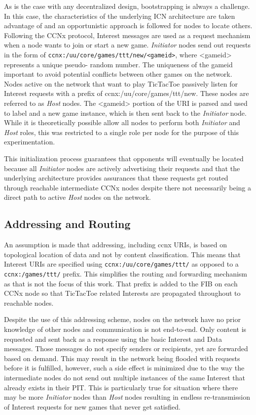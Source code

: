 \documentclass[a4paper,12pt]{report}      %
\begin{document}
As is the case with any decentralized design, bootstrapping is always a challenge. In this case, the
characteristics of the underlying ICN architecture are taken advantage of and an opportunistic approach
is followed for nodes to locate others. Following the CCNx protocol, Interest messages are used as a
request mechanism when a node wants to join or start a new game. \emph{Initiator} nodes send out requests in
the form of \verb!ccnx:/uu/core/games/ttt/new/<gameid>!, where <gameid> represents a unique pseudo-
random number. The uniqueness of the gameid important to avoid potential conflicts between other
games on the network. Nodes active on the network that want to play TicTacToe passively listen for
Interest requests with a prefix of ccnx:/uu/core/games/ttt/new. These nodes are referred to as \emph{Host}
nodes. The <gameid> portion of the URI is parsed and used to label and a new game instance, which is
then sent back to the \emph{Initiator} node. While it is theoretically possible allow 
all nodes to perform both \emph{Initiator} and \emph{Host} roles, this was restricted to a single role per node for
the purpose of this experimentation.

This initialization process guarantees that opponents will eventually be located because all \emph{Initiator}
nodes are actively advertising their requests and that the underlying architecture provides assurances
that these requests get routed through reachable intermediate CCNx nodes despite there not necessarily
being a direct path to active \emph{Host} nodes on the network.

\subsection{Addressing and Routing}

An assumption is made that addressing, including ccnx URIs, is based on topological location of
data and not by content classification. This means that Interest URIs are specified using
\verb!ccnx:/uu/core/games/ttt/! as opposed to a \verb!ccnx:/games/ttt/! prefix.
This simplifies the routing and forwarding mechanism as that is not the focus of this work. That prefix is added to the FIB
on each CCNx node so that TicTacToe related Interests are propagated throughout to reachable nodes.

Despite the use of this addressing scheme, nodes on the network have no prior knowledge of other
nodes and communication is not end-to-end. Only content is requested and sent back
as a response using the basic Interest and Data messages. Those messages do not specify senders or
recipients, yet are forwarded based on demand. This may result in the network being flooded with
requests before it is fulfilled, however, such a side effect is minimized due to the way the intermediate
nodes do not send out multiple instances of the same Interest that already exists in their PIT. This is
particularly true for situation where there may be more \emph{Initiator} nodes than \emph{Host} nodes resulting in
endless re-transmission of Interest requests for new games that never get satisfied.
\end{document}
